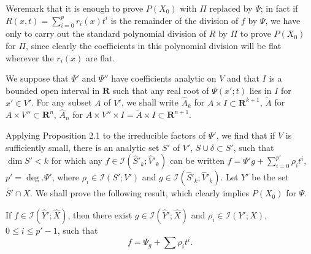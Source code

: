 We\pageoriginale remark that it is enough to prove $P(X_0)$ with $\Pi$ replaced by $\Psi$; in fact if $R(x,t) = \sum\limits^p_{i=0} r_i (x) t^i$ is the remainder of the division of $f$ by $\Psi$, we have only to carry out the standard polynomial division of $R$ by $\Pi$ to prove $P(X_0)$ for $\Pi$, since clearly the coefficients in this polynomial division will be flat wherever the $r_i (x)$ are flat.

We suppose that $\Psi'$ and $\Psi''$ have coefficients analytic on $V$ and that $I$ is a bounded open interval in $\mathbf{R}$ such that any real root of $\Psi(x'; t)$ lies in $I$ for $x'\in V'$. For any subset $A$ of $V'$, we shall write $\widehat{A}_k$ for $A \times I \subset \mathbf{R}^{k+1}$, $\tilde{A}$ for $A \times V'' \subset \mathbf{R}^n$, $\widehat{A}_n$ for $A \times V'' \times I = \tilde{A} \times I \subset \mathbf{R}^{n+1} $.

Applying Proposition 2.1 to the irreducible factors of $\Psi'$, we find that if $V$ is sufficiently small, there is an analytic set $S'$ of $V'$, $S \cup \delta \subset S'$, such that $\dim S' < k$ for which any $f \in \mathscr{I} (\widehat{S}'_k ; \widehat{V}'_k)$ can be written $f = \Psi' g + \sum\limits^{p'}_{i=0} \rho_i t^i$, $p' = \deg. \Psi'$, where $\rho_i \in \mathscr{I} (S'; V')$ and $g \in \mathscr{I}(\widehat{S}'_k; \widehat{V}'_k)$. Let $Y'$ be the set $\tilde{S'} \cap X$. We shall prove the following result, which clearly implies $P(X_0)$ for $\Psi$.

\setcounter{theorem}{3}
\begin{proposition}\label{chap5-prop3.4}
  If $f \in \mathscr{I}(\widehat{Y}'; \widehat{X})$, then there exist $g \in \mathscr{I}(\widehat{Y}'; \widehat{X})$ and $\rho_i \in \mathscr{I} (Y'; X)$, $0 \leq i \leq p' - 1$, such that
  $$
f = \Psi_g + \sum \rho_i t^i.
  $$
\end{proposition}

